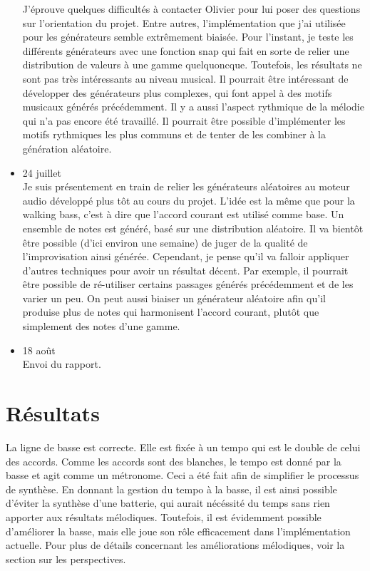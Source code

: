 \documentclass[letterpaper,12pt]{scrartcl}
\begin{document}
\begin{itemize}
	J'éprouve quelques difficultés à contacter Olivier pour lui poser des questions sur l'orientation du projet. Entre autres, l'implémentation que j'ai utilisée pour les générateurs semble extrêmement biaisée. Pour l'instant, je teste les différents générateurs avec une fonction snap qui fait en sorte de relier une distribution de valeurs à une gamme quelquoncque. Toutefois, les résultats ne sont pas très intéressants au niveau musical. Il pourrait être intéressant de développer des générateurs plus complexes, qui font appel à des motifs musicaux générés précédemment. Il y a aussi l'aspect rythmique de la mélodie qui n'a pas encore été travaillé. Il pourrait être possible d'implémenter les motifs rythmiques les plus communs et de tenter de les combiner à la génération aléatoire.
	\item 24 juillet\\
	Je suis présentement en train de relier les générateurs aléatoires au moteur audio développé plus tôt au cours du projet. L'idée est la même que pour la walking bass, c'est à dire que l'accord courant est utilisé comme base. Un ensemble de notes est généré, basé sur une distribution aléatoire. Il va bientôt être possible (d'ici environ une semaine) de juger de la qualité de l'improvisation ainsi générée. Cependant, je pense qu'il va falloir appliquer d'autres techniques pour avoir un résultat décent. Par exemple, il pourrait être possible de ré-utiliser certains passages générés précédemment et de les varier un peu. On peut aussi biaiser un générateur aléatoire afin qu'il produise plus de notes qui harmonisent l'accord courant, plutôt que simplement des notes d'une gamme.


	\item 18 août\\
	Envoi du rapport.
	
	\end{itemize}

	\section{Résultats}
	La ligne de basse est correcte. Elle est fixée à un tempo qui est le double de celui des accords. Comme les accords sont des blanches, le tempo est donné par la basse et agit comme un métronome. Ceci a été fait afin de simplifier le processus de synthèse. En donnant la gestion du tempo à la basse, il est ainsi possible d'éviter la synthèse d'une batterie, qui aurait nécéssité du temps sans rien apporter aux résultats mélodiques. Toutefois, il est évidemment possible d'améliorer la basse, mais elle joue son rôle efficacement dans l'implémentation actuelle. Pour plus de détails concernant les améliorations mélodiques, voir la section sur les perspectives. 
	
\end{document}
